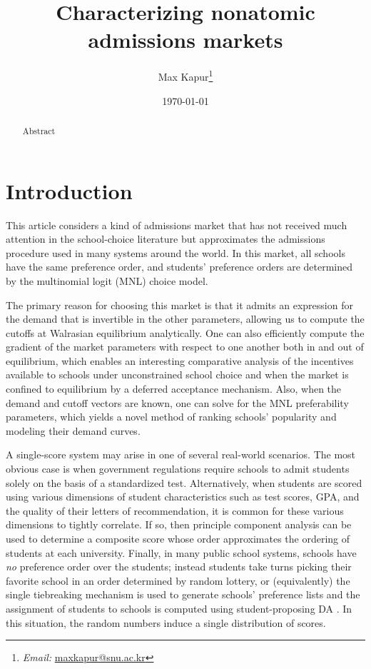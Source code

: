 \documentclass[12pt]{article}
\numberwithin{equation}{subsection}
\theoremstyle{definition}
\begin{document}
\title{Characterizing nonatomic admissions markets}
\date{\today}
\author{Max Kapur\footnote{\emph{Email:} \href{mailto:maxkapur@snu.ac.kr}{maxkapur@snu.ac.kr}}}



\maketitle

\begin{abstract}
Abstract
\end{abstract}

\pagebreak
\tableofcontents

\pagebreak
\section{Introduction}

This article considers a kind of admissions market that has not received much attention in the school-choice literature but approximates the admissions procedure used in many systems around the world. In this market, all schools have the same preference order, and students' preference orders are determined by the multinomial logit (MNL) choice model.

The primary reason for choosing this market is that it admits an expression for the demand that is invertible in the other parameters, allowing us to compute the cutoffs at Walrasian equilibrium analytically. One can also efficiently compute the gradient of the market parameters with respect to one another both in and out of equilibrium, which enables an interesting comparative analysis of the incentives available to schools under unconstrained school choice and when the market is confined to equilibrium by a deferred acceptance mechanism. Also, when the demand and cutoff vectors are known, one can solve for the MNL preferability parameters, which yields a novel method of ranking schools' popularity and modeling their demand curves. 

A single-score system may arise in one of several real-world scenarios. The most obvious case is when government regulations require schools to admit students solely on the basis of a standardized test. Alternatively, when students are scored using various dimensions of student characteristics such as test scores, GPA, and the quality of their letters of recommendation, it is common for these various dimensions to tightly correlate. If so, then principle component analysis can be used to determine a composite score whose order approximates the ordering of students at each university. Finally, in many public school systems, schools have \emph{no} preference order over the students; instead students take turns picking their favorite school in an order determined by random lottery, or (equivalently) the single tiebreaking mechanism is used to generate schools’ preference lists and the assignment of students to schools is computed using student-proposing DA \parencite[][]{whatmatters}. In this situation, the random numbers induce a single distribution of scores.
\end{document}
